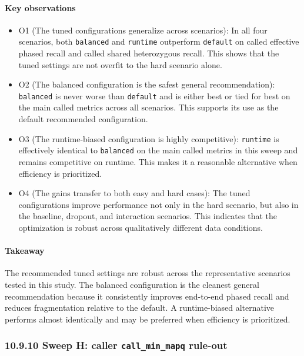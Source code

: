 \documentclass[
]{article}
\begin{document}
\paragraph{Key observations}\label{key-observations-15}

\begin{itemize}
\item
  O1 (The tuned configurations generalize across scenarios): In all four
  scenarios, both \texttt{balanced} and \texttt{runtime} outperform
  \texttt{default} on called effective phased recall and called shared
  heterozygous recall. This shows that the tuned settings are not
  overfit to the hard scenario alone.
\item
  O2 (The balanced configuration is the safest general recommendation):
  \texttt{balanced} is never worse than \texttt{default} and is either
  best or tied for best on the main called metrics across all scenarios.
  This supports its use as the default recommended configuration.
\item
  O3 (The runtime-biased configuration is highly competitive):
  \texttt{runtime} is effectively identical to \texttt{balanced} on the
  main called metrics in this sweep and remains competitive on runtime.
  This makes it a reasonable alternative when efficiency is prioritized.
\item
  O4 (The gains transfer to both easy and hard cases): The tuned
  configurations improve performance not only in the hard scenario, but
  also in the baseline, dropout, and interaction scenarios. This
  indicates that the optimization is robust across qualitatively
  different data conditions.
\end{itemize}

\paragraph{Takeaway}\label{takeaway-15}

The recommended tuned settings are robust across the representative
scenarios tested in this study. The balanced configuration is the
cleanest general recommendation because it consistently improves
end-to-end phased recall and reduces fragmentation relative to the
default. A runtime-biased alternative performs almost identically and
may be preferred when efficiency is prioritized.

\subsubsection{\texorpdfstring{10.9.10 Sweep H: caller
\texttt{call\_min\_mapq}
rule-out}{10.9.10 Sweep H: caller call\_min\_mapq rule-out}}\label{sweep-h-caller-call_min_mapq-rule-out}
\end{document}
